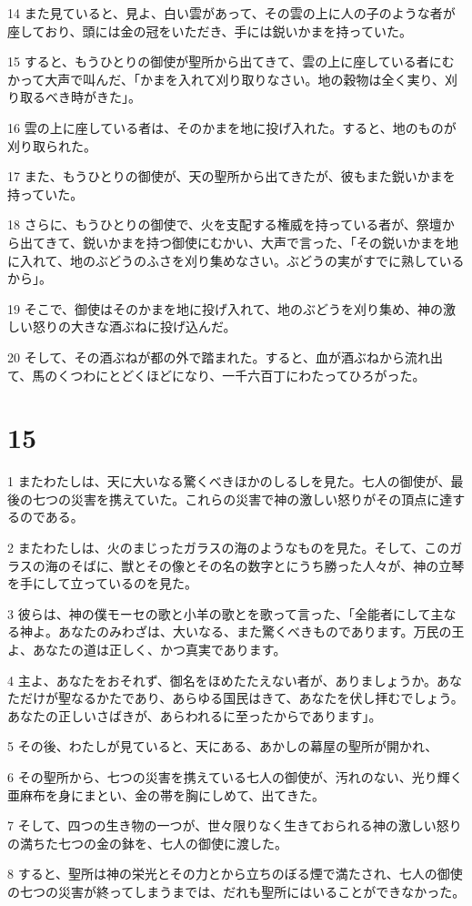 \par 14 また見ていると、見よ、白い雲があって、その雲の上に人の子のような者が座しており、頭には金の冠をいただき、手には鋭いかまを持っていた。
\par 15 すると、もうひとりの御使が聖所から出てきて、雲の上に座している者にむかって大声で叫んだ、「かまを入れて刈り取りなさい。地の穀物は全く実り、刈り取るべき時がきた」。
\par 16 雲の上に座している者は、そのかまを地に投げ入れた。すると、地のものが刈り取られた。
\par 17 また、もうひとりの御使が、天の聖所から出てきたが、彼もまた鋭いかまを持っていた。
\par 18 さらに、もうひとりの御使で、火を支配する権威を持っている者が、祭壇から出てきて、鋭いかまを持つ御使にむかい、大声で言った、「その鋭いかまを地に入れて、地のぶどうのふさを刈り集めなさい。ぶどうの実がすでに熟しているから」。
\par 19 そこで、御使はそのかまを地に投げ入れて、地のぶどうを刈り集め、神の激しい怒りの大きな酒ぶねに投げ込んだ。
\par 20 そして、その酒ぶねが都の外で踏まれた。すると、血が酒ぶねから流れ出て、馬のくつわにとどくほどになり、一千六百丁にわたってひろがった。

\chapter{15}

\par 1 またわたしは、天に大いなる驚くべきほかのしるしを見た。七人の御使が、最後の七つの災害を携えていた。これらの災害で神の激しい怒りがその頂点に達するのである。
\par 2 またわたしは、火のまじったガラスの海のようなものを見た。そして、このガラスの海のそばに、獣とその像とその名の数字とにうち勝った人々が、神の立琴を手にして立っているのを見た。
\par 3 彼らは、神の僕モーセの歌と小羊の歌とを歌って言った、「全能者にして主なる神よ。あなたのみわざは、大いなる、また驚くべきものであります。万民の王よ、あなたの道は正しく、かつ真実であります。
\par 4 主よ、あなたをおそれず、御名をほめたたえない者が、ありましょうか。あなただけが聖なるかたであり、あらゆる国民はきて、あなたを伏し拝むでしょう。あなたの正しいさばきが、あらわれるに至ったからであります」。
\par 5 その後、わたしが見ていると、天にある、あかしの幕屋の聖所が開かれ、
\par 6 その聖所から、七つの災害を携えている七人の御使が、汚れのない、光り輝く亜麻布を身にまとい、金の帯を胸にしめて、出てきた。
\par 7 そして、四つの生き物の一つが、世々限りなく生きておられる神の激しい怒りの満ちた七つの金の鉢を、七人の御使に渡した。
\par 8 すると、聖所は神の栄光とその力とから立ちのぼる煙で満たされ、七人の御使の七つの災害が終ってしまうまでは、だれも聖所にはいることができなかった。

